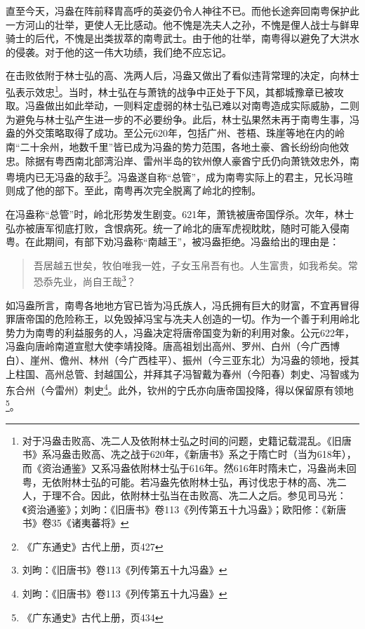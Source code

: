 直至今天，冯盎在阵前释胄高呼的英姿仍令人神往不已。而他长途奔回南粤保护此一方河山的壮举，更使人无比感动。他不愧是冼夫人之孙，不愧是俚人战士与鲜卑骑士的后代，不愧是出类拔萃的南粤武士。由于他的壮举，南粤得以避免了大洪水的侵袭。对于他的这一伟大功绩，我们绝不应忘记。

在击败依附于林士弘的高、冼两人后，冯盎又做出了看似违背常理的决定，向林士弘表示效忠\footnote{对于冯盎击败高、冼二人及依附林士弘之时间的问题，史籍记载混乱。《旧唐书》系冯盎击败高、冼之战于620年，《新唐书》系之于隋亡时（当为618年），而《资治通鉴》又系冯盎依附林士弘于616年。然616年时隋未亡，冯盎尚未回粤，无依附林士弘的可能。若冯盎先依附林士弘，再讨伐忠于林的高、冼二人，于理不合。因此，依附林士弘当在击败高、冼二人之后。参见司马光：《资治通鉴》；刘昫：《旧唐书》卷113《列传第五十九冯盎》；欧阳修：《新唐书》卷35《诸夷蕃将》}。当时，林士弘在与萧铣的战争中正处于下风，其都城豫章已被攻取。冯盎做出如此举动，一则料定虚弱的林士弘已难以对南粤造成实际威胁，二则为避免与林士弘产生进一步的不必要纷争。此后，林士弘果然未再于南粤生事，冯盎的外交策略取得了成功。至公元620年，包括广州、苍梧、珠崖等地在内的岭南“二十余州，地数千里”皆已成为冯盎的势力范围，各地土豪、酋长纷纷向他效忠。除据有粤西南北部湾沿岸、雷州半岛的钦州僚人豪酋宁氏仍向萧铣效忠外，南粤境内已无冯盎的敌手\footnote{《广东通史》古代上册，页427}。冯盎遂自称“总管”，成为南粤实际上的君主，兄长冯暄则成了他的部下。至此，南粤再次完全脱离了岭北的控制。

在冯盎称“总管”时，岭北形势发生剧变。621年，萧铣被唐帝国俘杀。次年，林士弘亦被唐军彻底打败，含恨病死。统一了岭北的唐军虎视眈眈，随时可能入侵南粤。在此期间，有部下劝冯盎称“南越王”，被冯盎拒绝。冯盎给出的理由是：

\begin{quote}

吾居越五世矣，牧伯唯我一姓，子女玉帛吾有也。人生富贵，如我希矣。常恐忝先业，尚自王哉\footnote{刘昫：《旧唐书》卷113《列传第五十九冯盎》}？

\end{quote}

如冯盎所言，南粤各地地方官已皆为冯氏族人，冯氏拥有巨大的财富，不宜再冒得罪唐帝国的危险称王，以免毁掉冯宝与冼夫人创造的一切。作为一个善于利用岭北势力为南粤的利益服务的人，冯盎决定将唐帝国变为新的利用对象。公元622年，冯盎向唐岭南道宣慰大使李靖投降。唐高祖划出高州、罗州、白州（今广西博白）、崖州、儋州、林州（今广西桂平）、振州（今三亚东北）为冯盎的领地，授其上柱国、高州总管、封越国公，并拜其子冯智戴为春州（今阳春）刺史、冯智彧为东合州（今雷州）刺史\footnote{刘昫：《旧唐书》卷113《列传第五十九冯盎》}。此外，钦州的宁氏亦向唐帝国投降，得以保留原有领地\footnote{《广东通史》古代上册，页434}。

